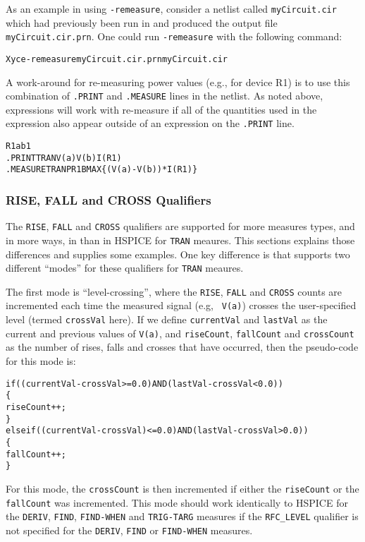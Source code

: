 As an example in using {\tt -remeasure}, consider a netlist called {\tt myCircuit.cir} which 
had previously been run in \Xyce{} and produced the output file {\tt myCircuit.cir.prn}.  One 
could run {\tt -remeasure} with the following command:
\begin{alltt}
Xyce -remeasure myCircuit.cir.prn myCircuit.cir
\end{alltt}

A work-around for re-measuring power values (e.g., for device R1) is to use this combination 
of {\tt .PRINT} and {\tt .MEASURE} lines in the netlist.  As noted above, expressions will 
work with re-measure if all of the quantities used in the expression also appear outside of 
an expression on the {\tt .PRINT} line.
\begin{alltt}
R1 a b 1
.PRINT TRAN V(a) V(b) I(R1)
.MEASURE TRAN PR1B MAX \{(V(a)-V(b))*I(R1)\}
\end{alltt}

\subsubsection{RISE, FALL and CROSS Qualifiers}
The \texttt{RISE}, \texttt{FALL} and \texttt{CROSS} qualifiers are supported for more 
measures types, and in more ways, in \Xyce{} than in HSPICE for \texttt{TRAN} meaures.  This 
sections explains those differences and supplies some examples.  One key difference is that 
\Xyce{} supports two different ``modes'' for these qualifiers for  \texttt{TRAN} meaures.  

The first mode is ``level-crossing'', where the \texttt{RISE}, \texttt{FALL} 
and \texttt{CROSS} counts are incremented each time the measured signal (e.g, 
\texttt{ V(a)}) crosses the user-specified level (termed \texttt{crossVal} here).  
If we define \texttt{currentVal} and \texttt{lastVal} as the current and previous 
values of \texttt{V(a)}, and \texttt{riseCount}, \texttt{fallCount} and 
\texttt{crossCount} as the number of rises, falls and crosses that have occurred,
then the pseudo-code for this mode is:
\begin{alltt}
if ( (currentVal-crossVal >= 0.0) AND (lastVal-crossVal < 0.0) )
\{
  riseCount++;
\}
else if( (currentVal-crossVal) <= 0.0) AND (lastVal-crossVal > 0.0) )
\{   
  fallCount++;
\}
\end{alltt}
For this mode, the \texttt{crossCount} is then incremented if either the 
\texttt{riseCount}  or the \texttt{fallCount} was incremented.  This mode
should work identically to HSPICE for the \texttt{DERIV}, \texttt{FIND}, 
\texttt{FIND-WHEN} and \texttt{TRIG-TARG} measures if the \texttt{RFC\_LEVEL} 
qualifier is not specified for the \texttt{DERIV}, \texttt{FIND}
or \texttt{FIND-WHEN} measures.


